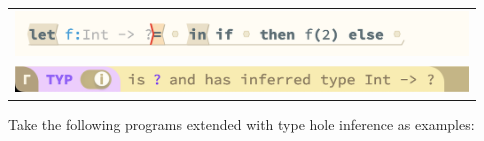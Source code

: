 
\begin{tabular}[b]{c}
\includegraphics[width=12cm]{images/example_holes.png} \\
\includegraphics[width=12cm]{images/example_holes_CI.png}
\end{tabular}


Take the following \Hazel programs extended with type hole inference as examples: 

